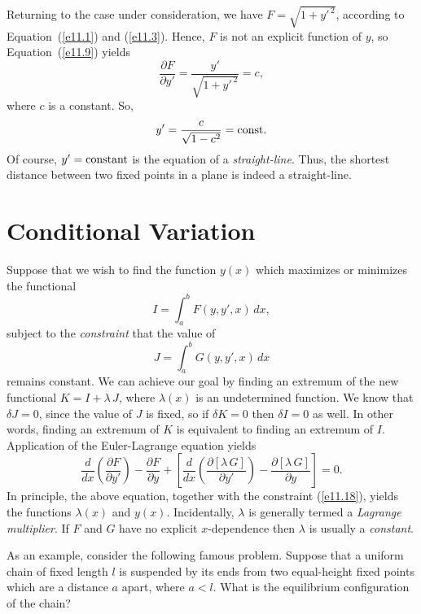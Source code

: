 Returning to the  case under consideration, we have $F = \sqrt{1+y'^{\,2}}$, according to Equation~(\ref{e11.1}) and (\ref{e11.3}).  Hence, $F$ is not
an explicit function of $y$, so Equation~(\ref{e11.9}) yields
\begin{equation}
\frac{\partial F}{\partial y'} = \frac{y'}{\sqrt{1+y'^{\,2}}} = c,
\end{equation}
where $c$ is a constant. So,
\begin{equation}
y' = \frac{c}{\sqrt{1-c^2}} = {\rm const}.
\end{equation}
Of course, $y' = {\rm constant}$ is the equation of a {\em straight-line}. Thus, the shortest distance between two fixed points in a plane is indeed a
straight-line.

\section{Conditional Variation}
Suppose that we wish to find the function $y(x)$ which
maximizes or minimizes the functional
\begin{equation}
I = \int_a^b F(y, y',x)\,dx,
\end{equation}
subject to the {\em  constraint}\/ that the value of
\begin{equation}\label{e11.18}
J = \int_a^b G(y,y',x)\,dx
\end{equation}
remains constant. We can achieve our goal by finding an  extremum of the new functional
$K = I + \lambda\,J$, where $\lambda(x)$ is an undetermined function. We know
that $\delta J = 0$, since the value of $J$ is fixed, so if $\delta K= 0$ then
$\delta I = 0$ as well. In other words, finding an extremum of $K$ is equivalent
to finding an extremum of $I$. Application of the Euler-Lagrange
equation yields
\begin{equation}
\frac{d}{dx}\!\left(\frac{\partial F}{\partial y'}\right)-\frac{\partial F}{\partial y} +\left[\frac{d}{dx}\!\left(\frac{\partial [\lambda\,G]}{\partial y'}\right)-\frac{\partial [\lambda\,G]}{\partial y}\right]= 0.
\end{equation}
In principle, the above equation, together with the constraint (\ref{e11.18}),
yields the  functions $\lambda(x)$ and  $y(x)$. Incidentally,  $\lambda$ is generally
termed a {\em Lagrange multiplier}.  If $F$ and $G$ have no explicit $x$-dependence then $\lambda$ is usually a {\em constant}.

As an example, consider the following famous problem. Suppose that a uniform
chain of fixed length $l$ is suspended by its ends from
two equal-height fixed points which are a distance $a$ apart, where $a < l$. 
What is the equilibrium configuration of the chain?

